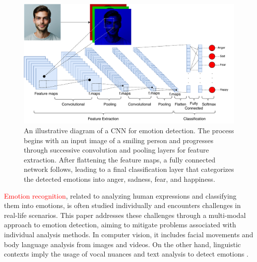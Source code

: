\documentclass[runningheads]{llncs}
\begin{document}
\begin{figure}[htb]
\centering
\includegraphics[width=0.97\linewidth]{CNNArchitecture.pdf}
\caption{An illustrative diagram of a CNN for emotion detection. The process begins with an input image of a smiling person and progresses through successive convolution and pooling layers for feature extraction. After flattening the feature maps, a fully connected network follows, leading to a final classification layer that categorizes the detected emotions into anger, sadness, fear, and happiness.}
\label{fig:cnnarchitecture}
\end{figure}

\textcolor{red}{Emotion recognition}, related to analyzing human expressions and classifying them into emotions, is often studied individually and encounters challenges in real-life scenarios. This paper addresses these challenges through a multi-modal approach to emotion detection, aiming to mitigate problems associated with individual analysis methods. In computer vision, it includes facial movements and body language analysis from images and videos. On the other hand, linguistic contexts imply the usage of vocal nuances and text analysis to detect emotions \cite{Chul2018, Trigeorgis2016, Karna2020}. 
\end{document}
